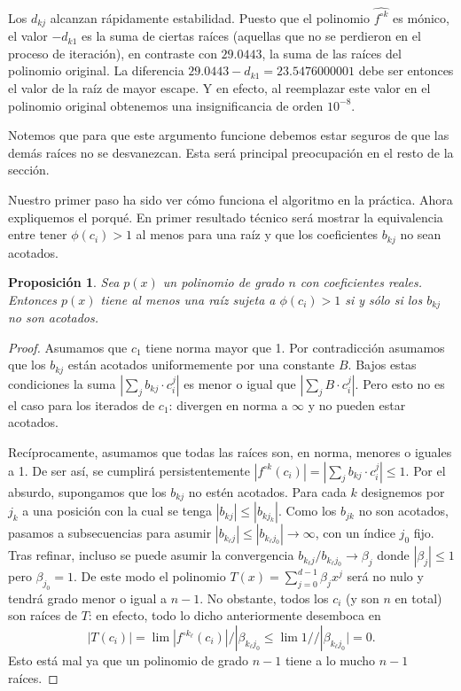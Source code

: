 \documentclass[oneside,11pt]{book}
\theoremstyle{definition}
\theoremstyle{plain}
\newtheorem{proposition}[counter]{Proposición}
\theoremstyle{remark}
\begin{document}
Los $d_{kj}$ alcanzan r\'apidamente estabilidad. 
Puesto que el polinomio $\hat{f^{\circ k}}$ es m\'onico,  
el valor $-d_{k1}$ es la suma de ciertas ra\'ices (aquellas que no se perdieron en el proceso de iteraci\'on),
en contraste con $29.0443$, la suma de las ra\'ices del polinomio original.
La diferencia $29.0443-d_{k1}=23.5476000001$ debe ser entonces el valor de la ra\'iz de mayor escape. 
Y en efecto, al reemplazar este valor en el polinomio original obtenemos una insignificancia de orden $10^{-8}$.

Notemos que para que este argumento funcione debemos estar seguros de que las dem\'as ra\'ices no se desvanezcan.
Esta ser\'a principal preocupaci\'on en el resto de la secci\'on.

Nuestro primer paso ha sido ver c\'omo funciona el algoritmo en la pr\'actica. 
Ahora expliquemos el porqu\'e.
En primer resultado t\'ecnico ser\'a mostrar la equivalencia entre 
tener $\phi(c_i)>1$ al menos para una ra\'iz y que los coeficientes $b_{kj}$ no sean acotados.

\begin{proposition}
Sea $p(x)$ un polinomio de grado $n$ con coeficientes reales.
Entonces $p(x)$ tiene al menos una ra\'iz sujeta a $\phi(c_i)>1$ si y s\'olo si 
los $b_{kj}$ no son acotados.
\end{proposition}
\begin{proof}
Asumamos que $c_1$ tiene norma mayor que 1.
Por contradicci\'on asumamos que los $b_{kj}$ est\'an acotados uniformemente por una constante $B$.
Bajos estas condiciones la suma $|\sum_j b_{kj} \cdot c_i^j|$ es menor o igual que $|\sum_j B \cdot c_i^j |$. 
Pero esto no es el caso para los iterados de $c_1$: 
divergen en norma a $\infty$ y no pueden estar acotados.

Rec\'iprocamente, asumamos que todas las ra\'ices son, en norma, menores o iguales a 1. 
De ser as\'i, se cumplir\'a persistentemente $|f^{\circ k}(c_i)|=|\sum_j b_{kj} \cdot c_i^j| \le 1$. 
Por el absurdo, supongamos que los $b_{kj}$ no est\'en acotados. 
Para cada $k$ designemos por $j_k$ a una posici\'on con la cual se tenga $|b_{kj}| \le |b_{kj_k}|$. 
Como los $b_{jk}$ no son acotados, pasamos a subsecuencias para asumir
$|b_{k_\ell j}| \le |b_{k_\ell j_0}| \to \infty$, con un \'indice $j_0$ fijo. 
Tras refinar, incluso se puede asumir la convergencia $b_{k_\ell j}/b_{k_\ell j_0} \to \beta_j$ 
donde $|\beta_j| \le 1$ pero $\beta_{j_0}=1$. 
De este modo el polinomio $T(x)=\sum_{j=0}^{d-1} \beta_j x^j$ ser\'a no nulo y tendr\'a grado menor o igual a $n-1$. 
No obstante, todos los $c_i$ (y son $n$ en total) son ra\'ices de $T$: 
en efecto, todo lo dicho anteriormente desemboca en  
$$
|T(c_i)|=\lim |f^{\circ k_\ell}(c_i)|/|\beta_{k_\ell j_0} \le \lim 1//|\beta_{k_\ell j_0} |=0. 
$$
Esto est\'a mal ya que un polinomio de grado $n-1$ tiene a lo mucho $n-1$ ra\'ices. 
\end{proof}
\medskip
\end{document}
